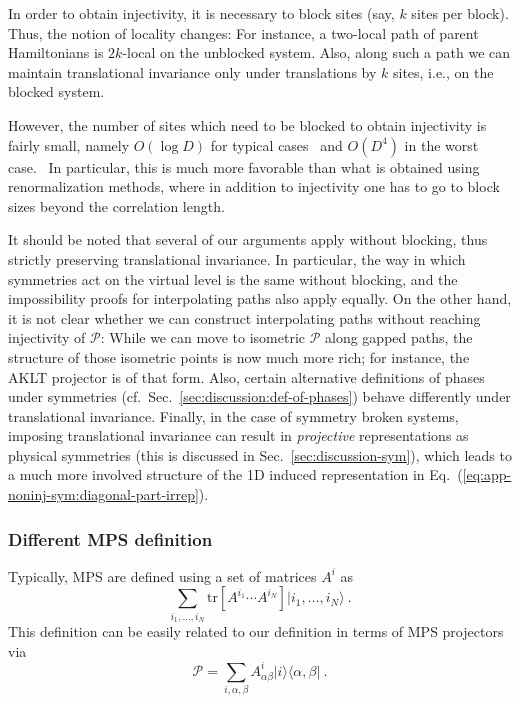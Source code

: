 \documentclass[twocolumn,superscriptaddress,prb,linenumbers]{revtex4-1}
\newcommand{\ket}[1]{\vert#1\rangle}
\newcommand{\bra}[1]{\langle#1\vert}
\newcommand{\mc}[1]{\mathcal{#1}}
\newcommand{\tr}{\mathrm{tr}}
\begin{document}
In order to obtain injectivity, it is necessary to block sites (say, $k$ sites
per block). Thus, the notion of locality changes: For instance, a
two-local path of parent Hamiltonians is $2k$-local on the unblocked
system. Also, along such a path we can maintain translational
invariance only under translations by $k$ sites, i.e., on the blocked
system.

However, the number of sites which need to be blocked to obtain
injectivity is fairly small, namely $O(\log D)$ for typical
cases~\cite{perez-garcia:fractionalization} and
$O(D^4)$ in the worst case.~\cite{sanz:wielandt}  In
particular, this is much more favorable than what is obtained using
renormalization methods,\cite{chen:1d-phases-rg} where in addition to
injectivity one has to go to block sizes beyond the correlation
length.

It should be noted that several of our arguments apply without blocking,
thus strictly preserving translational invariance.  In particular, the way
in which symmetries act on the virtual level is the same without blocking,
and the impossibility proofs for interpolating paths also apply equally.
On the other hand, it is not clear whether we can construct interpolating
paths without reaching injectivity of $\mc P$: While we can move to
isometric $\mc P$ along gapped paths, the structure of those isometric
points is now much more rich; for instance, the AKLT projector is of that
form. Also, certain alternative definitions of phases under symmetries
(cf.~Sec.~\ref{sec:discussion:def-of-phases}) behave differently under
translational invariance.  Finally, in the case of symmetry broken
systems,
imposing translational invariance can result in
\emph{projective} representations as physical symmetries (this is
discussed in Sec.~\ref{sec:discussion-sym}), which leads to a much more
involved structure of the 1D induced representation in
Eq.~(\ref{eq:app-noninj-sym:diagonal-part-irrep}).



\subsubsection{Different MPS definition
    \label{sec:disc:mps-with-matrices}}

Typically, MPS are defined using a set of matrices $A^i$ as
\[
    \sum_{i_1,\dots,i_N}\tr[A^{i_1}\cdots A^{i_N}]\ket{i_1,\dots,i_N}\ .
\]
This definition can be easily related to our definition in terms of MPS
projectors via
\[
    \mc P = \sum_{i,\alpha,\beta} A^i_{\alpha\beta}
    \ket{i}\bra{\alpha,\beta}\ .
\]
\end{document}
